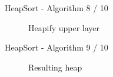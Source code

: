 
\begin{frame}{HeapSort - Algorithm 8 / 10}
  \begin{centering}
   \begin{figure}[!h]%
     \begin{columns}%
       \begin{column}{0.425\textwidth}%
         \begin{adjustbox}{width=\linewidth}%
         \end{adjustbox}%
       \end{column}%
       \begin{column}{0.425\textwidth}%
          \begin{adjustbox}{width=\linewidth}%
          \end{adjustbox}%
        \end{column}%
      \end{columns}%
      \caption{Heapify upper layer}%
      \label{fig:heapify_upper}%
    \end{figure}
  \end{centering}
\end{frame}


\begin{frame}{HeapSort - Algorithm 9 / 10}
  \begin{centering}
    \begin{figure}[!h]
      \begin{adjustbox}{width=0.425\linewidth}%
      \end{adjustbox}%
      \caption{Resulting heap}%
      \label{fig:heapify_upper_final}%
    \end{figure}
  \end{centering}
\end{frame}


